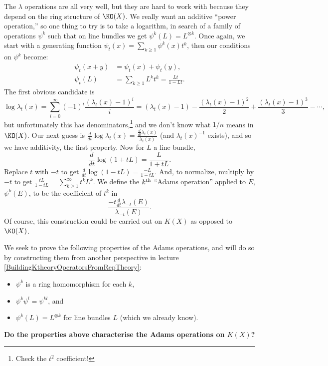 The $\lambda$ operations are all very well, but they are hard to work with because they depend on the ring structure of $\KO(X)$.  We really want an additive ``power operation,'' so one thing to try is to take a logarithm, in search of a family of operations $\psi^k$ such that on line bundles we get $\psi^k(L) = L^{\otimes k}$.  Once again, we start with a generating function $\psi_t(x) = \sum_{k \ge 1} \psi^k(x) t^k$, then our conditions on $\psi^k$ become:
\begin{align*}
\psi_t(x + y) & = \psi_t (x) + \psi_t (y), \\
\psi_t(L) & = \sum_{k \ge 1} L^k t^k = \frac{Lt}{1 - Lt}.
\end{align*}
The first obvious candidate is \[\log \lambda_t(x) = \sum_{i=0}^\infty (-1)^i \frac{(\lambda_t(x) - 1)^i}{i} = (\lambda_t(x) - 1) - \frac{(\lambda_t(x) - 1)^2}{2} + \frac{(\lambda_t(x) - 1)^3}{3} - \cdots,\] but unfortunately this has denominators,\footnote{Check the $t^2$ coefficient!} and we don't know what $1/n$ means in $\KO(X)$.  Our next guess is $\frac{d}{dt} \log \lambda_t(x) = \frac{\frac{d}{dt} \lambda_t(x)}{\lambda_t(x)}$ (and $\lambda_t(x)^{-1}$ exists), and so we have additivity, the first property.  Now for $L$ a line bundle,
\[
\frac{d}{dt} \log (1 + tL) = \frac{L}{1 + tL}
.\]
Replace $t$ with $-t$ to get $\frac{d}{dt} \log(1 - tL) = \frac{-L}{1 - tL}$.  And, to normalize, multiply by $-t$ to get $\frac{tL}{1 - tL} = \sum_{k \ge 1}^\infty t^k L^k$.  We define the $k^\textup{th}$ ``Adams operation'' applied to $E$, $\psi^k(E)$, to be the coefficient of $t^k$ in \[\frac{-t \frac{d}{dt} \lambda_{-t}(E)}{\lambda_{-t}(E)}.\]
Of course, this construction could be carried out on $K(X)$ as opposed to $\KO(X)$.

We seek to prove the following properties of the Adams operations, and will do so by constructing them from another perspective in lecture \ref{BuildingKtheoryOperatorsFromRepTheory}:
\begin{itemize}
\item $\psi^k$ is a ring homomorphism for each $k$,
\item $\psi^k \psi^l = \psi^{kl}$, and
\item $\psi^k(L) = L^{\otimes k}$ for line bundles $L$ (which we already know).
\end{itemize}
\noindent\textbf{Do the properties above characterise the Adams operations on $K(X)$?}

